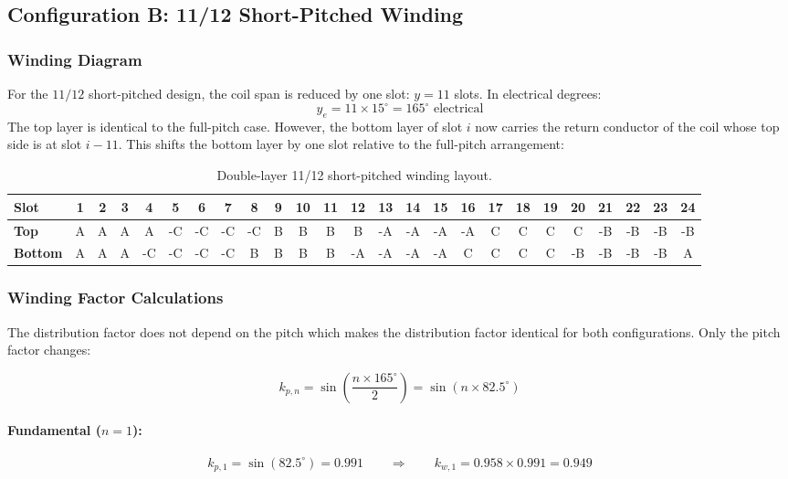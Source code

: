 \documentclass[12pt, a4paper]{article}
\begin{document}
\subsection{Configuration B: 11/12 Short-Pitched Winding}

\subsubsection{ Winding Diagram}

For the $11/12$ short-pitched design, the coil span is reduced by one slot: $y = 11$ slots. In electrical degrees:
\[
    y_e = 11 \times 15^\circ = 165^\circ \text{ electrical}
\]
The top layer is identical to the full-pitch case. However, the bottom layer of slot $i$ now carries the return conductor of the coil whose top side is at slot $i - 11$. This shifts the bottom layer by one slot relative to the full-pitch arrangement:

\begin{table}[h!]
\centering
\footnotesize
\setlength{\tabcolsep}{2pt}
\caption{Double-layer 11/12 short-pitched winding layout.}
\begin{tabular}{l|cccc|cccc|cccc|cccc|cccc|cccc}
\toprule
\textbf{Slot} & 1 & 2 & 3 & 4 & 5 & 6 & 7 & 8 & 9 & 10 & 11 & 12 & 13 & 14 & 15 & 16 & 17 & 18 & 19 & 20 & 21 & 22 & 23 & 24 \\
\midrule
\textbf{Top}& A & A & A & A & -C & -C & -C & -C & B & B & B & B & -A & -A & -A  & -A  & C & C & C & C & -B & -B & -B & -B \\
\textbf{Bottom} & A & A & A & -C & -C & -C & -C & B & B & B & B & -A & -A & -A & -A  & C & C & C & C & -B & -B & -B & -B & A \\
\bottomrule
\end{tabular}
\end{table}

\subsubsection{Winding Factor Calculations}
The distribution factor does not depend on the pitch which makes the distribution factor identical for both configurations. Only the pitch factor changes:

\[k_{p,n} = \sin\!\left(\frac{n \times 165^\circ}{2}\right) = \sin(n \times 82.5^\circ)\]

\paragraph{Fundamental ($n = 1$):}
\[k_{p,1} = \sin(82.5^\circ) = 0.991 \qquad \Rightarrow \qquad k_{w,1} = 0.958 \times 0.991 = 0.949\]
\end{document}
